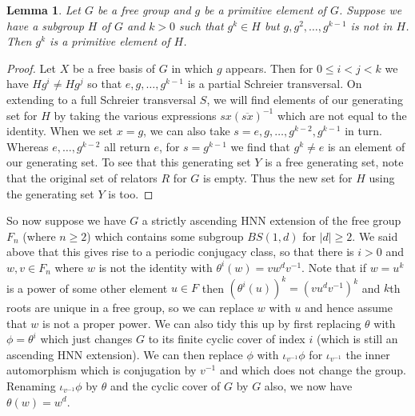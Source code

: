 \documentclass[11pt,reqno]{amsart}
\numberwithin{equation}{section}
\newcommand{\leqs}{\leqslant}
\newcommand{\geqs}{\geqslant}
\newtheorem{lemma}[thm]{Lemma}
\theoremstyle{definition}
\theoremstyle{remark}
\begin{document}
\begin{lemma} \label{prim}
  Let $G$ be a free group and $g$ be a primitive element of $G$. Suppose
  we have a subgroup $H$ of $G$ and $k>0$ such that $g^k\in H$ but
  $g,g^2,\ldots ,g^{k-1}$ is not in $H$. Then $g^k$ is a primitive element
  of $H$.
\end{lemma}
\begin{proof}
Let $X$ be a free basis of $G$ in which $g$ appears. Then for
$0\leqs i<j<k$ we have $Hg^i\neq Hg^j$ so that $e,g,\ldots, g^{k-1}$ is a
partial Schreier transversal. On extending to a full Schreier transversal $S$,
we will find elements of our generating set for $H$ by taking the various
expressions $sx(\overline{sx})^{-1}$ which are not equal to the identity.
When we set $x=g$, we can also take $s=e,g,\ldots ,g^{k-2},g^{k-1}$ in turn.
Whereas $e,\ldots ,g^{k-2}$ all return $e$, for $s=g^{k-1}$ we find that
$g^k\neq e$ is an element of our generating set. To see that this
generating set $Y$ is a free
generating set, note that the original set of relators $R$ for $G$ is empty.
Thus the new set for $H$ using the generating set $Y$ is too.
\end{proof}

So now suppose we have $G$ a strictly ascending HNN extension of the free
group $F_n$ (where $n\geqs 2$) which contains some subgroup $BS(1,d)$ for
$|d|\geqs 2$. We said above that this gives rise to a
periodic conjugacy class, so that there is $i>0$ and
  $w,v\in F_n$ where $w$ is not the identity with $\theta^i(w)=vw^dv^{-1}$.
  Note that if $w=u^k$ is a power of some other element $u\in F$ then
  $(\theta^i(u))^k=(vu^dv^{-1})^k$ and $k$th roots are unique in a free
  group, so we can replace $w$ with $u$ and hence
  assume that $w$ is not a proper power.
  We can also tidy this up by first replacing $\theta$ with $\phi=\theta^i$
  which just changes $G$ to its finite cyclic cover of index $i$
  (which is still an ascending HNN extension).
  We can then replace $\phi$ with $\iota_{v^{-1}}\phi$ for $\iota_{v^{-1}}$
  the inner automorphism which is conjugation by $v^{-1}$ and which does
  not change the group. Renaming
  $\iota_{v^{-1}}\phi$ by $\theta$ and the cyclic cover of $G$ by
  $G$ also, we now have $\theta(w)=w^d$.
\end{document}

